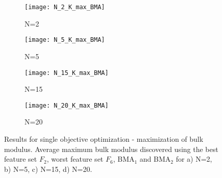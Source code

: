 \documentclass[preprint,amsmath,amssymb,aps, prb,showkeys]{revtex4-1}
\begin{document}
\begin{figure}[htp]
        \parbox{.975\textwidth}{
            \begin{subfigure}{.475\linewidth}
                \texttt{[image: N\_2\_K\_max\_BMA]}
                \caption{N=2}
                \label{fig:Max_bulk_N_2_BMA}
        \end{subfigure}
        	\begin{subfigure}{.475\linewidth}
                \texttt{[image: N\_5\_K\_max\_BMA]}
                \caption{N=5}
                \label{fig:Max_bulk_N_5_BMA}
        \end{subfigure}
        	\begin{subfigure}{.475\linewidth}
                \texttt{[image: N\_15\_K\_max\_BMA]}
                \caption{N=15}
                \label{fig:Max_bulk_N_15_BMA}
        \end{subfigure}
        	\begin{subfigure}{.475\linewidth}
                \texttt{[image: N\_20\_K\_max\_BMA]}
                \caption{N=20}
                \label{fig:Max_bulk_N_20_BMA}
        \end{subfigure}
        }
        \caption{ Results for single objective optimization - maximization of bulk modulus. Average maximum bulk modulus discovered using the best feature set $F_2$, worst feature set $F_6$, BMA$_1$ and BMA$_2$ for a) N=2, b) N=5, c) N=15, d) N=20.}
        \label{fig:Max_bulk_modulus_single_BMA}       
\end{figure} 
\end{document}
